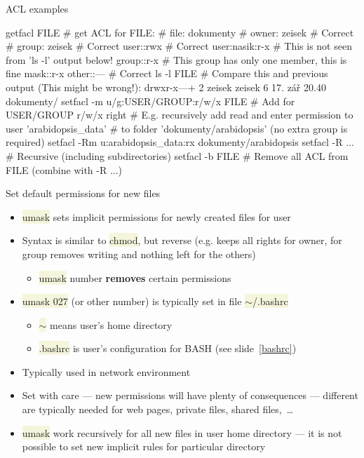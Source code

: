 \documentclass[compress, xelatex, 11pt, xcolor=svgnames, aspectratio=169, url={hyphens, lowtilde}]{beamer}
\renewcommand{\texttt}[1]{\colorbox{Beige}{{\ttfamily #1}}}
\begin{document}
\begin{frame}[fragile]{ACL examples}
	\begin{bashcode}
    getfacl FILE # get ACL for FILE:
    # file: dokumenty
    # owner: zeisek # Correct
    # group: zeisek # Correct
    user::rwx       # Correct
    user:nasik:r-x  # This is not seen from 'ls -l' output below!
    group::r-x      # This group has only one member, this is fine
    mask::r-x
    other::---      # Correct
    ls -l FILE # Compare this and previous output (This might be wrong!):
    drwxr-x---+  2 zeisek zeisek     6 17. zář 20.40 dokumenty/
    setfacl -m u/g:USER/GROUP:r/w/x FILE # Add for USER/GROUP r/w/x right
    # E.g. recursively add read and enter permission to user 'arabidopsis_data'
    # to folder 'dokumenty/arabidopsis' (no extra group is required)
    setfacl -Rm u:arabidopsis_data:rx dokumenty/arabidopsis
    setfacl -R ... # Recursive (including subdirectories)
    setfacl -b FILE # Remove all ACL from FILE (combine with -R ...)
	\end{bashcode}
\end{frame}

\begin{frame}{Set default permissions for new files}
	\begin{itemize}
		\item \texttt{umask} sets implicit permissions for newly created files for user
		\item Syntax is similar to \texttt{chmod}, but reverse (e.g. \texttt{027} keeps all rights for owner, for group removes writing and nothing left for the others)
		\begin{itemize}
			\item \texttt{umask} number \textbf{removes} certain permissions
		\end{itemize}
		\item \texttt{umask 027} (or other number) is typically set in file \texttt{$\sim$/.bashrc}
		\begin{itemize}
			\item \texttt{$\sim$} means user's home directory
			\item \texttt{.bashrc} is user's configuration for BASH (see slide~\ref{bashrc})
		\end{itemize}
		\item Typically used in network environment
		\item Set with care --- new permissions will have plenty of consequences --- different are typically needed for web pages, private files, shared files,~\ldots
		\item \texttt{umask} work recursively for all new files in user home directory --- it is not possible to set new implicit rules for particular directory
	\end{itemize}
\end{frame}
\end{document}
